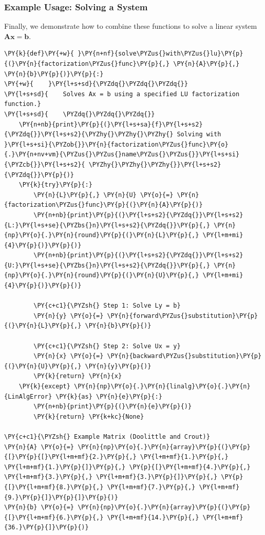 \subsubsection*{Example Usage: Solving a System}
Finally, we demonstrate how to combine these functions to solve a linear system $\mathbf{A}\mathbf{x} = \mathbf{b}$.

\begin{Verbatim}[commandchars=\\\{\}]
\PY{k}{def}\PY{+w}{ }\PY{n+nf}{solve\PYZus{}with\PYZus{}lu}\PY{p}{(}\PY{n}{factorization\PYZus{}func}\PY{p}{,} \PY{n}{A}\PY{p}{,} \PY{n}{b}\PY{p}{)}\PY{p}{:}
\PY{+w}{    }\PY{l+s+sd}{\PYZdq{}\PYZdq{}\PYZdq{}}
\PY{l+s+sd}{    Solves Ax = b using a specified LU factorization function.}
\PY{l+s+sd}{    \PYZdq{}\PYZdq{}\PYZdq{}}
    \PY{n+nb}{print}\PY{p}{(}\PY{l+s+sa}{f}\PY{l+s+s2}{\PYZdq{}}\PY{l+s+s2}{\PYZhy{}\PYZhy{}\PYZhy{} Solving with }\PY{l+s+si}{\PYZob{}}\PY{n}{factorization\PYZus{}func}\PY{o}{.}\PY{n+nv+vm}{\PYZus{}\PYZus{}name\PYZus{}\PYZus{}}\PY{l+s+si}{\PYZcb{}}\PY{l+s+s2}{ \PYZhy{}\PYZhy{}\PYZhy{}}\PY{l+s+s2}{\PYZdq{}}\PY{p}{)}
    \PY{k}{try}\PY{p}{:}
        \PY{n}{L}\PY{p}{,} \PY{n}{U} \PY{o}{=} \PY{n}{factorization\PYZus{}func}\PY{p}{(}\PY{n}{A}\PY{p}{)}
        \PY{n+nb}{print}\PY{p}{(}\PY{l+s+s2}{\PYZdq{}}\PY{l+s+s2}{L:}\PY{l+s+se}{\PYZbs{}n}\PY{l+s+s2}{\PYZdq{}}\PY{p}{,} \PY{n}{np}\PY{o}{.}\PY{n}{round}\PY{p}{(}\PY{n}{L}\PY{p}{,} \PY{l+m+mi}{4}\PY{p}{)}\PY{p}{)}
        \PY{n+nb}{print}\PY{p}{(}\PY{l+s+s2}{\PYZdq{}}\PY{l+s+s2}{U:}\PY{l+s+se}{\PYZbs{}n}\PY{l+s+s2}{\PYZdq{}}\PY{p}{,} \PY{n}{np}\PY{o}{.}\PY{n}{round}\PY{p}{(}\PY{n}{U}\PY{p}{,} \PY{l+m+mi}{4}\PY{p}{)}\PY{p}{)}

        \PY{c+c1}{\PYZsh{} Step 1: Solve Ly = b}
        \PY{n}{y} \PY{o}{=} \PY{n}{forward\PYZus{}substitution}\PY{p}{(}\PY{n}{L}\PY{p}{,} \PY{n}{b}\PY{p}{)}

        \PY{c+c1}{\PYZsh{} Step 2: Solve Ux = y}
        \PY{n}{x} \PY{o}{=} \PY{n}{backward\PYZus{}substitution}\PY{p}{(}\PY{n}{U}\PY{p}{,} \PY{n}{y}\PY{p}{)}
        \PY{k}{return} \PY{n}{x}
    \PY{k}{except} \PY{n}{np}\PY{o}{.}\PY{n}{linalg}\PY{o}{.}\PY{n}{LinAlgError} \PY{k}{as} \PY{n}{e}\PY{p}{:}
        \PY{n+nb}{print}\PY{p}{(}\PY{n}{e}\PY{p}{)}
        \PY{k}{return} \PY{k+kc}{None}

\PY{c+c1}{\PYZsh{} Example Matrix (Doolittle and Crout)}
\PY{n}{A} \PY{o}{=} \PY{n}{np}\PY{o}{.}\PY{n}{array}\PY{p}{(}\PY{p}{[}\PY{p}{[}\PY{l+m+mf}{2.}\PY{p}{,} \PY{l+m+mf}{1.}\PY{p}{,} \PY{l+m+mf}{1.}\PY{p}{]}\PY{p}{,} \PY{p}{[}\PY{l+m+mf}{4.}\PY{p}{,} \PY{l+m+mf}{3.}\PY{p}{,} \PY{l+m+mf}{3.}\PY{p}{]}\PY{p}{,} \PY{p}{[}\PY{l+m+mf}{8.}\PY{p}{,} \PY{l+m+mf}{7.}\PY{p}{,} \PY{l+m+mf}{9.}\PY{p}{]}\PY{p}{]}\PY{p}{)}
\PY{n}{b} \PY{o}{=} \PY{n}{np}\PY{o}{.}\PY{n}{array}\PY{p}{(}\PY{p}{[}\PY{l+m+mf}{6.}\PY{p}{,} \PY{l+m+mf}{14.}\PY{p}{,} \PY{l+m+mf}{36.}\PY{p}{]}\PY{p}{)}


\end{Verbatim}
